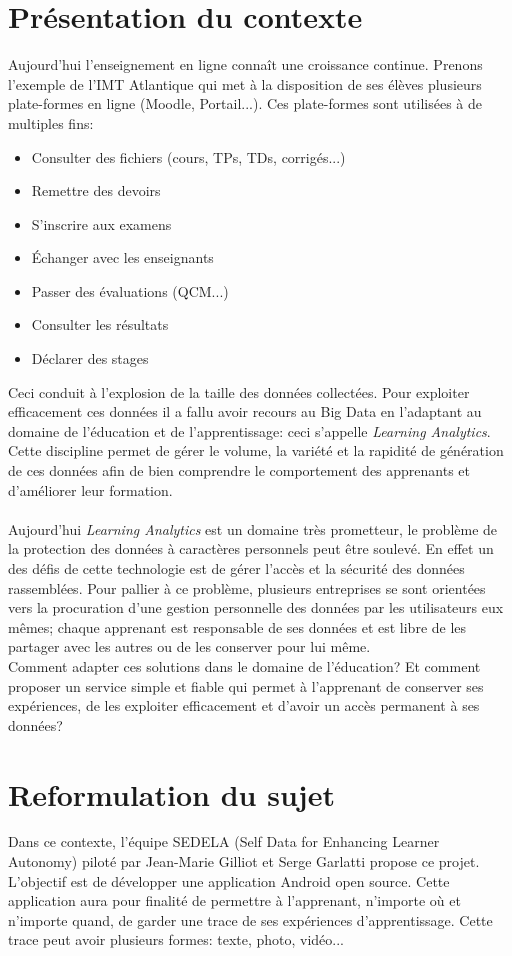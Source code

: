 \documentclass{report}
\begin{document}
\section{Présentation du contexte}
Aujourd'hui l'enseignement en ligne connaît une croissance continue. Prenons l'exemple de l'IMT Atlantique qui met à la disposition de ses élèves plusieurs plate-formes en ligne (Moodle, Portail...). Ces plate-formes sont utilisées à de multiples fins:
\begin{itemize}
    \item Consulter des fichiers (cours, TPs, TDs, corrigés...)
    \item Remettre des devoirs
    \item S'inscrire aux examens
    \item Échanger avec les enseignants
    \item Passer des évaluations (QCM...)
    \item Consulter les résultats
    \item Déclarer des stages
\end{itemize}
Ceci conduit à l'explosion de la taille des données collectées. Pour exploiter efficacement ces données il a fallu avoir recours au Big Data en l'adaptant au domaine de l'éducation et de l'apprentissage: ceci s'appelle \emph{Learning Analytics}.\\ 
Cette discipline permet de gérer le volume, la variété et la rapidité de génération de ces données afin  de bien comprendre le comportement des apprenants et d'améliorer leur formation.\cite{ref1} 
\\
\\
Aujourd'hui \emph{Learning Analytics} est un domaine très prometteur, le problème de la protection des données à caractères personnels peut être soulevé.
En effet un des défis de cette technologie est de gérer l'accès et la sécurité des données rassemblées.
Pour pallier à ce problème, plusieurs entreprises se sont orientées vers la procuration d'une gestion personnelle des données par les utilisateurs eux mêmes; chaque apprenant est responsable de ses données et est libre de les partager avec les autres ou de les conserver pour lui même.
\\
Comment adapter ces solutions dans le domaine de l'éducation? 
Et comment proposer un service simple et fiable qui permet à l'apprenant de conserver ses expériences, de les exploiter efficacement et d'avoir un accès permanent à ses données?


\section{Reformulation du sujet}
Dans ce contexte, l'équipe SEDELA (Self Data for
Enhancing Learner Autonomy) piloté par Jean-Marie Gilliot et Serge Garlatti propose ce projet. L'objectif est de développer une application Android open source. Cette application aura pour finalité de permettre à l'apprenant, n'importe où et n'importe quand, de garder une trace de ses expériences d'apprentissage. Cette trace peut avoir plusieurs formes: texte, photo, vidéo... 
\\
\end{document}
